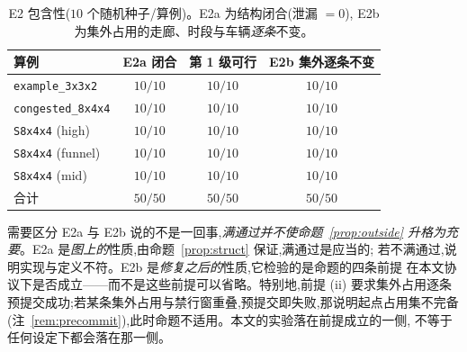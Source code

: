 \documentclass[manuscript,screen,review]{acmart}
\newcommand{\NSeeds}{10}
\newcommand{\NPairs}{50}
\newcommand{\PassClosed}{\NPairs/\NPairs}    %
\newcommand{\PassInvar}{\NPairs/\NPairs}     %
\begin{document}
\begin{table}[t]
\centering
\caption{E2 包含性(\(\NSeeds\) 个随机种子/算例)。E2a 为结构闭合(泄漏 \(=0\)),
E2b 为集外占用的走廊、时段与车辆\emph{逐条}不变。}
\label{tab:e2}
\small
\begin{tabular}{@{}lccc@{}}
\toprule
算例 & E2a 闭合 & 第 1 级可行 & E2b 集外逐条不变 \\
\midrule
\texttt{example\_3x3x2}   & \(10/10\) & \(10/10\) & \(10/10\) \\
\texttt{congested\_8x4x4} & \(10/10\) & \(10/10\) & \(10/10\) \\
\texttt{S8x4x4} (high)    & \(10/10\) & \(10/10\) & \(10/10\) \\
\texttt{S8x4x4} (funnel)  & \(10/10\) & \(10/10\) & \(10/10\) \\
\texttt{S8x4x4} (mid)     & \(10/10\) & \(10/10\) & \(10/10\) \\
\midrule
合计 & \(\PassClosed\) & \(\NPairs/\NPairs\) & \(\PassInvar\) \\
\bottomrule
\end{tabular}
\end{table}

需要区分 E2a 与 E2b 说的不是一回事,\emph{满通过并不使命题~\ref{prop:outside}
升格为充要}。E2a 是\emph{图上的}性质,由命题~\ref{prop:struct} 保证,满通过是应当的;
若不满通过,说明实现与定义不符。E2b 是\emph{修复之后的}性质,它检验的是命题的四条前提
在本文协议下是否成立——而不是这些前提可以省略。特别地,前提 (ii) 要求集外占用逐条
预提交成功;若某条集外占用与禁行窗重叠,预提交即失败,那说明起点占用集不完备
(注~\ref{rem:precommit}),此时命题不适用。本文的实验落在前提成立的一侧,
不等于任何设定下都会落在那一侧。
\end{document}
